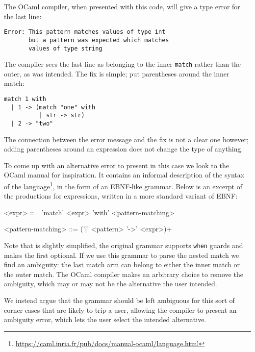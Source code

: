 \documentclass[sigplan]{acmart}\settopmatter{printfolios=true,printccs=false,printacmref=false}
\newcommand{\ocaml}{\lstinline[language={[objective]caml}]}
\begin{document}
\noindent The OCaml compiler, when presented with this code, will give a type error for the last line:

\begin{lstlisting}
Error: This pattern matches values of type int
       but a pattern was expected which matches
       values of type string
\end{lstlisting}

\noindent The compiler sees the last line as belonging to the inner \ocaml{match} rather than the outer, as was intended. The fix is simple; put parentheses around the inner match:

\begin{lstlisting}[language={[objective]caml}]
match 1 with
  | 1 -> (match "one" with
          | str -> str)
  | 2 -> "two"
\end{lstlisting}

\noindent The connection between the error message and the fix is not a clear one however; adding parentheses around an expression does not change the type of anything.

To come up with an alternative error to present in this case we look to the OCaml manual for inspiration. It contains an informal description of the syntax of the language\footnote{\url{https://caml.inria.fr/pub/docs/manual-ocaml/language.html}}, in the form of an EBNF-like grammar. Below is an excerpt of the productions for expressions, written in a more standard variant of EBNF:

\setlength{\grammarindent}{5em}
\begin{grammar}
<expr> ::= 'match' <expr> 'with' <pattern-matching>

<pattern-matching> ::= ('|' <pattern> '->' <expr>)+
\end{grammar}

Note that  is slightly simplified, the original grammar supports \ocaml{when} guards and makes the first \lit{|} optional. If we use this grammar to parse the nested match we find an ambiguity: the last match arm can belong to either the inner match or the outer match. The OCaml compiler makes an arbitrary choice to remove the ambiguity, which may or may not be the alternative the user intended.

We instead argue that the grammar should be left ambiguous for this sort of corner cases that are likely to trip a user, allowing the compiler to present an ambiguity error, which lets the user select the intended alternative.
\end{document}
